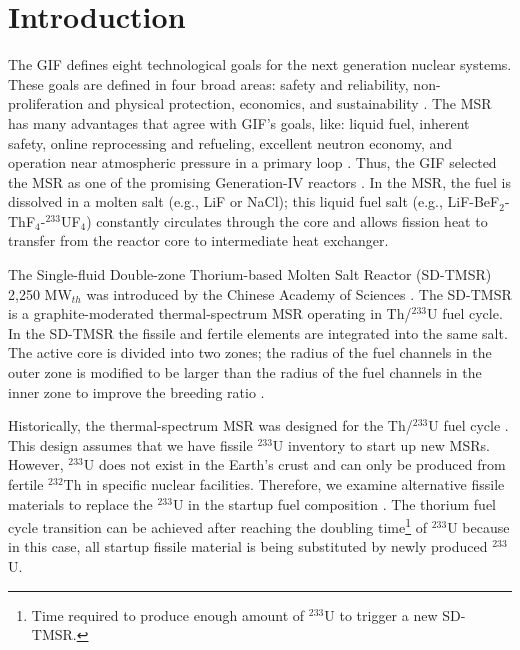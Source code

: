 \section{Introduction} \label{Introduction}
The \gls{GIF} defines eight technological goals for the next generation
nuclear systems. These goals are defined in four broad areas: safety and reliability, non-proliferation and physical protection, economics, and sustainability \cite{doe2002technology}. The \gls{MSR} has many advantages that agree
with \gls{GIF}'s goals, like: liquid fuel, inherent safety, online
reprocessing and refueling, excellent neutron economy, and operation near
atmospheric
pressure in a primary loop \cite{siemer2015molten,rosenthal1970molten}.
Thus, the \gls{GIF} selected the \gls{MSR} as one of the promising Generation-IV
reactors \cite{doe2002technology,pioro2016handbook}.
In the \gls{MSR}, the fuel is dissolved in a molten salt (e.g., LiF or NaCl);
this liquid fuel salt (e.g., LiF-BeF$_2$-ThF$_4$-$^{233}$UF$_4$) constantly
circulates through the core and allows fission heat to transfer from the reactor
core to intermediate heat exchanger.

The Single-fluid Double-zone Thorium-based Molten Salt Reactor (SD-TMSR) 2,250
MW$_{th}$ was introduced by the Chinese Academy of Sciences \cite{li_optimization_2018}. The
SD-TMSR
is a graphite-moderated thermal-spectrum \gls{MSR} operating in Th/$^{233}$U
fuel cycle. In the SD-TMSR the fissile and fertile elements are integrated
into the same salt. The active core is divided into two zones;
the radius of the fuel channels in the outer zone is modified to be larger
than the radius of the fuel channels in the inner zone to improve the breeding
ratio \cite{nuttin2005potential,li_optimization_2018}.

Historically, the thermal-spectrum \gls{MSR} was designed for the Th/$^{233}$U
fuel cycle \cite{rykhlevskii2019modeling,nuttin2005potential,
	merle2004scenarios,rosenthal1970molten}. This design assumes that we have
fissile $^{233}$U inventory to start up new \glspl{MSR}. However, $^{233}$U does not
exist in the Earth's crust and can only be produced from fertile $^{232}$Th in 
specific nuclear facilities. Therefore, we examine alternative fissile
materials to replace the $^{233}$U in the startup fuel
composition \cite{betzler2016modeling,zou2018transition}. The thorium fuel
cycle transition can be achieved after reaching the doubling
time\footnote{Time required to produce enough amount of $^{233}$U to trigger a
	new SD-TMSR.} of $^{233}$U because in this case, all startup fissile material
is being substituted by newly produced $^{233}$U.

